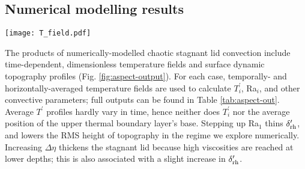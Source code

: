 \subsection{Numerical modelling results}

\begin{figure*}[htbp!] 
\centering    
\texttt{[image: T\_field.pdf]}
\caption[A single time snapshot of dimensionless temperatures and surface dynamic topography, for chaotically time-dependent convection in the stagnant lid regime.]{Snapshot from a single time step of the dimensionless temperature field \textit{(bottom)}, surface dynamic topography, $h^\prime$ \textit{(top)}, and temperature profile, $T^\prime$ \textit{(right)}, for chaotically time-dependent convection in the stagnant lid regime. This example shows Ra$_1 = 1 \times 10^8$ and $\Delta \eta = 1 \times 10^8$. The dimensionless temperatures range from 0 (cold; blue) to 1 (hot; red). The grey box in the temperature profile shows the instantaneous location and thickness of the upper thermal boundary layer. The vertical scale of $h^\prime$ is exaggerated.}
\label{fig:aspect-output}
\end{figure*}


The products of numerically-modelled chaotic stagnant lid convection include time-dependent, dimensionless temperature fields and surface dynamic topography profiles (Fig. \ref{fig:aspect-output}). For each case, temporally- and horizontally-averaged temperature fields are used to calculate $T_i^\prime$, Ra$_i$, and other convective parameters; full outputs can be found in Table \ref{tab:aspect-out}. Average $T^\prime$ profiles hardly vary in time, hence neither does $T_i^\prime$ nor the average position of the upper thermal boundary layer's base. Stepping up Ra$_1$ thins $\delta_{\rm rh}^\prime$, and lowers the RMS height of topography in the regime we explore numerically. Increasing $\Delta \eta$ thickens the stagnant lid because high viscosities are reached at lower depths; this is also associated with a slight increase in $\delta_{\rm rh}^\prime$. 









